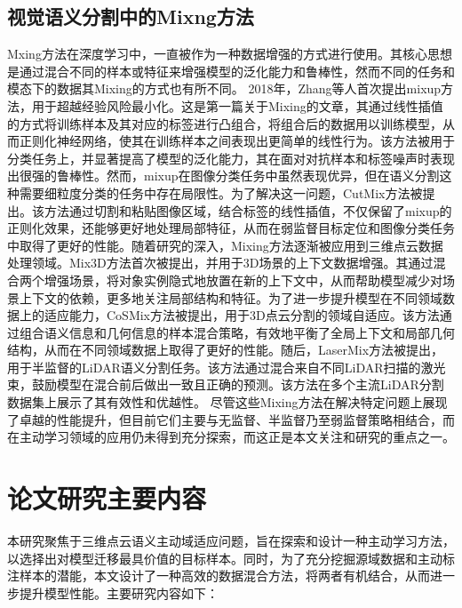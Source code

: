 \subsection{视觉语义分割中的Mixng方法}
Mxing方法在深度学习中，一直被作为一种数据增强的方式进行使用。其核心思想是通过混合不同的样本或特征来增强模型的泛化能力和鲁棒性，然而不同的任务和模态下的数据其Mixing的方式也有所不同。
2018年，Zhang等人首次提出mixup方法，用于超越经验风险最小化。这是第一篇关于Mixing的文章，其通过线性插值的方式将训练样本及其对应的标签进行凸组合，将组合后的数据用以训练模型，从而正则化神经网络，使其在训练样本之间表现出更简单的线性行为。该方法被用于分类任务上，并显著提高了模型的泛化能力，其在面对对抗样本和标签噪声时表现出很强的鲁棒性。然而，mixup在图像分类任务中虽然表现优异，但在语义分割这种需要细粒度分类的任务中存在局限性。为了解决这一问题，CutMix方法被提出。该方法通过切割和粘贴图像区域，结合标签的线性插值，不仅保留了mixup的正则化效果，还能够更好地处理局部特征，从而在弱监督目标定位和图像分类任务中取得了更好的性能。随着研究的深入，Mixing方法逐渐被应用到三维点云数据处理领域。Mix3D方法首次被提出，并用于3D场景的上下文数据增强。其通过混合两个增强场景，将对象实例隐式地放置在新的上下文中，从而帮助模型减少对场景上下文的依赖，更多地关注局部结构和特征。为了进一步提升模型在不同领域数据上的适应能力，CoSMix方法被提出，用于3D点云分割的领域自适应。该方法通过组合语义信息和几何信息的样本混合策略，有效地平衡了全局上下文和局部几何结构，从而在不同领域数据上取得了更好的性能。随后，LaserMix方法被提出，用于半监督的LiDAR语义分割任务。该方法通过混合来自不同LiDAR扫描的激光束，鼓励模型在混合前后做出一致且正确的预测。该方法在多个主流LiDAR分割数据集上展示了其有效性和优越性。
尽管这些Mixing方法在解决特定问题上展现了卓越的性能提升，但目前它们主要与无监督、半监督乃至弱监督策略相结合，而在主动学习领域的应用仍未得到充分探索，而这正是本文关注和研究的重点之一。

\section{论文研究主要内容}
本研究聚焦于三维点云语义主动域适应问题，旨在探索和设计一种主动学习方法，以选择出对模型迁移最具价值的目标样本。同时，为了充分挖掘源域数据和主动标注样本的潜能，本文设计了一种高效的数据混合方法，将两者有机结合，从而进一步提升模型性能。主要研究内容如下：


